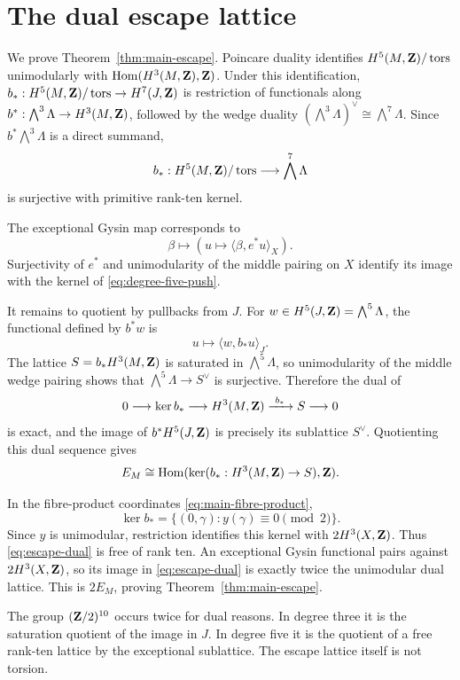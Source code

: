 \section{The dual escape lattice}\label{sec:duality}

We prove Theorem~\ref{thm:main-escape}.  Poincare duality identifies
\(H^5(M,\mathbf Z)/\operatorname{tors}\) unimodularly with
\(\operatorname{Hom}(H^3(M,\mathbf Z),\mathbf Z)\).  Under this identification,
\(b_*:H^5(M,\mathbf Z)/\operatorname{tors}\to H^7(J,\mathbf Z)\) is restriction of
functionals along \(b^*:\bigwedge^3\Lambda\to H^3(M,\mathbf Z)\), followed by
the wedge duality \((\bigwedge^3\Lambda)^\vee\cong\bigwedge^7\Lambda\).
Since \(b^*\bigwedge^3\Lambda\) is a direct summand,
\begin{equation}\label{eq:degree-five-push}
 b_*:H^5(M,\mathbf Z)/\operatorname{tors}\longrightarrow\bigwedge^7\Lambda
\end{equation}
is surjective with primitive rank-ten kernel.

The exceptional Gysin map corresponds to
\[
 \beta\longmapsto\left(u\longmapsto
 \langle\beta,e^*u\rangle_X\right).
\]
Surjectivity of \(e^*\) and unimodularity of the middle pairing on \(X\)
identify its image with the kernel of \eqref{eq:degree-five-push}.

It remains to quotient by pullbacks from \(J\).  For
\(w\in H^5(J,\mathbf Z)=\bigwedge^5\Lambda\), the functional defined by \(b^*w\)
is
\[
 u\longmapsto\langle w,b_*u\rangle_J.
\]
The lattice \(S=b_*H^3(M,\mathbf Z)\) is saturated in
\(\bigwedge^5\Lambda\), so unimodularity of the middle wedge pairing shows
that \(\bigwedge^5\Lambda\to S^\vee\) is surjective.  Therefore
the dual of
\[
 0\longrightarrow\ker b_*\longrightarrow H^3(M,\mathbf Z)
 \xrightarrow{\ b_*\ }S\longrightarrow0
\]
is exact, and the image of \(b^*H^5(J,\mathbf Z)\) is precisely its sublattice
\(S^\vee\).  Quotienting this dual sequence gives
\begin{equation}\label{eq:escape-dual}
 E_M\cong\operatorname{Hom}(\ker(b_*:H^3(M,\mathbf Z)\to S),\mathbf Z).
\end{equation}

In the fibre-product coordinates \eqref{eq:main-fibre-product},
\[
 \ker b_*=\{(0,\gamma):y(\gamma)\equiv0\pmod2\}.
\]
Since \(y\) is unimodular, restriction identifies this kernel with
\(2H^3(X,\mathbf Z)\).  Thus \eqref{eq:escape-dual} is free of rank ten.  An
exceptional Gysin functional pairs against \(2H^3(X,\mathbf Z)\), so its image in
\eqref{eq:escape-dual} is exactly twice the unimodular dual lattice.  This
is \(2E_M\), proving Theorem~\ref{thm:main-escape}.

\begin{remark}\label{rem:two-torsion-location}
The group \((\mathbf Z/2)^{10}\) occurs twice for dual reasons.  In degree three
it is the saturation quotient of the image in \(J\).  In degree five it is
the quotient of a free rank-ten lattice by the exceptional sublattice.
The escape lattice itself is not torsion.
\end{remark}

